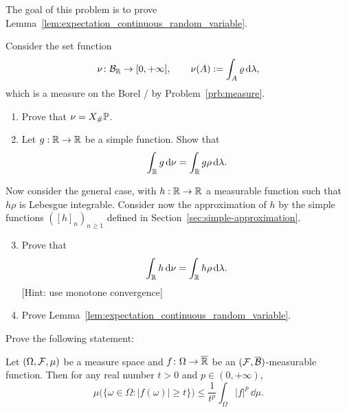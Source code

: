 \begin{problem}\label{prb:expectation_continuous_random_variable}
The goal of this problem is to prove Lemma~\ref{lem:expectation_continuous_random_variable}. 

Consider the set function
\[
	\nu\colon \mathcal B_{\mathbb R} \to [0,+\infty],\qquad\nu(A) := \int_A \varrho\, \mathrm{d} \lambda,
\]
which is a measure on the Borel \sigalg/ by Problem~\ref{prb:measure}.
\begin{enumerate}[label=(\alph*)]
\item Prove that $\nu = X_\# \mathbb P$.
\item Let $g : \mathbb R \to \mathbb R$ be a simple function. Show that
\[
	\int_{\mathbb R} g \, \mathrm{d} \nu = \int_{\mathbb R} g \rho \, \mathrm{d} \lambda.
\]
\end{enumerate}

Now consider the general case, with $h : \mathbb R \to \mathbb R$ a measurable function such that $h \rho$ is Lebesgue integrable. Consider now the approximation of $h$ by the simple functions $([h]_n)_{n \ge 1}$ defined in Section~\ref{sec:simple-approximation}.
\begin{enumerate}[label=(\alph*)]
\setcounter{enumi}{2}
\item Prove that 
\[
	\int_{\mathbb R} h \, \mathrm{d} \nu = \int_{\mathbb R} h \rho \, \mathrm{d} \lambda.
\]
[Hint: use monotone convergence]
\item Prove Lemma~\ref{lem:expectation_continuous_random_variable}.
\end{enumerate}
\end{problem}

\begin{problem}
	Prove the following statement: 
	
	\smallskip
	Let $(\Omega,\mathcal F,\mu)$ be a measure space and $f\colon \Omega\to \overline{\mathbb R}$ be an $(\mathcal F,\overline{\mathcal B})$-measurable function. Then for any real number $t>0$ and $p\in(0,+\infty)$,
	\[
		\mu\bigl(\{\omega\in\Omega : |f(\omega)|\ge t\}\bigr) \le \frac{1}{t^p}\int_\Omega |f|^p\,\dd\mu.
	\]
\end{problem}

